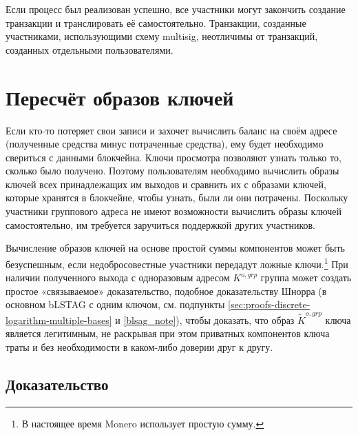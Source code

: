 Если процесс был реализован успешно, все участники могут закончить создание транзакции и транслировать её самостоятельно. Транзакции, созданные участниками, использующими схему multisig, неотличимы от транзакций, созданных отдельными пользователями.



\section{Пересчёт образов ключей}
\label{sec:recalculating-key-images-multisig}

Если кто-то потеряет свои записи и захочет вычислить баланс на своём адресе (полученные средства минус потраченные средства), ему будет необходимо свериться с данными блокчейна. Ключи просмотра позволяют узнать только то, сколько было получено. Поэтому пользовате\-лям необходимо вычислить образы ключей всех принадлежащих им выходов и сравнить их с образами ключей, которые хранятся в блокчейне, чтобы узнать, были ли они потрачены. Поскольку участники группового адреса не имеют возможности вычислить образы ключей самостоятельно, им требуется заручиться поддержкой других участников.

Вычисление образов ключей на основе простой суммы компонентов может быть безуспешным, если недобросовестные участники передадут ложные ключи.\footnote{В настоящее время Monero использует простую сумму.} При наличии полученного выхода с одноразовым адресом $K^{o,grp}$ группа может создать простое «связываемое» доказа\-тельство, подобное доказательству Шнорра (в основном bLSTAG с одним ключом, см. под\-пункты \ref{sec:proofs-discrete-logarithm-multiple-bases} и \ref{blsag_note}), чтобы доказать, что образ $\tilde{K}^{o,grp}$ ключа является легитимным, не раскрывая при этом приватных компонентов ключа траты и без необходимости в каком-либо доверии друг к другу.


\subsection*{Доказательство}

